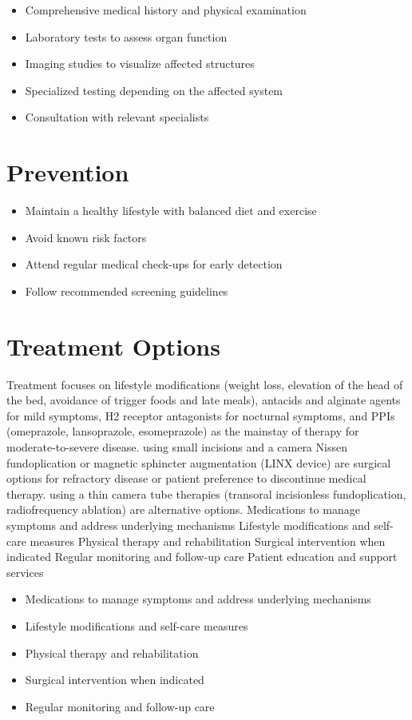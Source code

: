 \begin{itemize}[noitemsep]
  \item Comprehensive medical history and physical examination
  \item Laboratory tests to assess organ function
  \item Imaging studies to visualize affected structures
  \item Specialized testing depending on the affected system
  \item Consultation with relevant specialists
\end{itemize}
\section{Prevention}
\begin{itemize}[noitemsep]
  \item Maintain a healthy lifestyle with balanced diet and exercise
  \item Avoid known risk factors
  \item Attend regular medical check-ups for early detection
  \item Follow recommended screening guidelines
\end{itemize}
\section{Treatment Options}
Treatment focuses on lifestyle modifications (weight loss, elevation of the head of the bed, avoidance of trigger foods and late meals), antacids and alginate agents for mild symptoms, H2 receptor antagonists for nocturnal symptoms, and PPIs (omeprazole, lansoprazole, esomeprazole) as the mainstay of therapy for moderate-to-severe disease. using small incisions and a camera Nissen fundoplication or magnetic sphincter augmentation (LINX device) are surgical options for refractory disease or patient preference to discontinue medical therapy. using a thin camera tube therapies (transoral incisionless fundoplication, radiofrequency ablation) are alternative options. Medications to manage symptoms and address underlying mechanisms Lifestyle modifications and self-care measures Physical therapy and rehabilitation Surgical intervention when indicated Regular monitoring and follow-up care Patient education and support services

\begin{itemize}[noitemsep]
  \item Medications to manage symptoms and address underlying mechanisms
  \item Lifestyle modifications and self-care measures
  \item Physical therapy and rehabilitation
  \item Surgical intervention when indicated
  \item Regular monitoring and follow-up care
\end{itemize}
